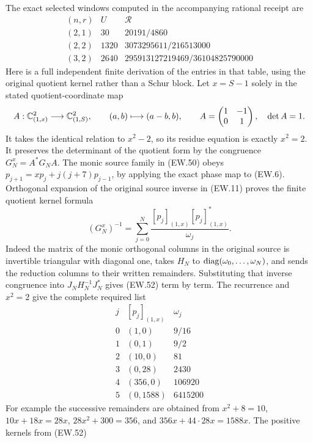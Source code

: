 The exact selected windows computed in the accompanying rational
receipt are
\[
\begin{array}{c|c|c}
 (n,r)&U&\mathscr R\\\hline
 (2,1)&30&20191/4860\\
 (2,2)&1320&3073295611/216513000\\
 (3,2)&2640&295913127219469/36104825790000
\end{array}                                                   \tag{EW.51}
\]
Here is a full independent finite derivation of the entries in that
table, using the original quotient kernel rather than a Schur block.
Let $x=S-1$ solely in the stated quotient-coordinate map
\[
 A:\mathbb C^2_{(1,x)}\longrightarrow\mathbb C^2_{(1,S)},\qquad
 (a,b)\longmapsto(a-b,b),\qquad
 A=\begin{pmatrix}1&-1\\0&1\end{pmatrix},\quad\det A=1.
\]
It takes the identical relation to $x^2-2$, so its residue equation
is exactly $x^2=2$. It preserves the determinant of the quotient
form by the congruence $G_N^x=A^*G_NA$. The monic source family
in (EW.50) obeys
$p_{j+1}=xp_j+j(j+7)p_{j-1}$, by applying the exact phase map to
(EW.6). Orthogonal expansion of the original source inverse in
(EW.11) proves the finite quotient kernel formula
\[
 (G_N^x)^{-1}=\sum_{j=0}^N
     \frac{[p_j]_{(1,x)}[p_j]_{(1,x)}^*}{\omega_j}.
                                                               \tag{EW.52}
\]
Indeed the matrix of the monic orthogonal columns in the original
source is invertible triangular with diagonal one, takes $H_N$
to $\operatorname{diag}(\omega_0,\ldots,\omega_N)$, and sends the reduction
columns to their written remainders. Substituting that inverse
congruence into $J_NH_N^{-1}J_N^*$ gives (EW.52) term by term.
The recurrence and $x^2=2$ give the complete required list
\[
\begin{array}{c|c|c}
 j &[p_j]_{(1,x)}&\omega_j\\\hline
 0&(1,0)&9/16\\
 1&(0,1)&9/2\\
 2&(10,0)&81\\
 3&(0,28)&2430\\
 4&(356,0)&106920\\
 5&(0,1588)&6415200
\end{array}                                                   \tag{EW.53}
\]
For example the successive remainders are obtained from
$x^2+8=10$, $10x+18x=28x$, $28x^2+300=356$, and
$356x+44\cdot28x=1588x$. The positive kernels from (EW.52)
